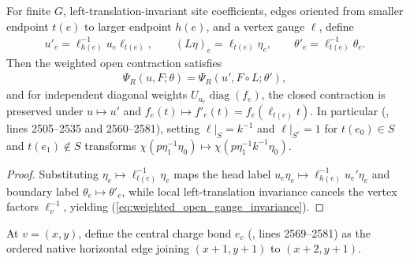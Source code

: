 \begin{lemma}
    \label{thm:peps_regular_weighted_gauge_transport}
    \leanok
    For finite $G$, left-translation-invariant site coefficients, edges oriented from smaller endpoint $t(e)$ to larger endpoint $h(e)$, and a vertex gauge $\ell$, define
    \begin{align}
        u'_e=\ell_{h(e)}^{-1}u_e\ell_{t(e)},\qquad
        (L\eta)_e=\ell_{t(e)}\eta_e,\qquad
        \theta'_e=\ell_{t(e)}^{-1}\theta_e. \label{eq:vertex_gauge_transform}
    \end{align}
    Then the weighted open contraction satisfies
    \begin{align}
        \Psi_R(u,F;\theta)=\Psi_R(u',F\circ L;\theta'), \label{eq:weighted_open_gauge_invariance}
    \end{align}
    and for independent diagonal weights $U_{u_e}\operatorname{diag}(f_e)$, the closed contraction is preserved under $u\mapsto u'$ and $f_e(t)\mapsto f'_e(t)=f_e(\ell_{t(e)}t)$.
    In particular (\cite{Schuch2010PEPS}, lines 2505--2535 and 2560--2581), setting $\ell|_S=k^{-1}$ and $\ell|_{S^c}=1$ for $t(e_0)\in S$ and $t(e_1)\notin S$ transforms $\chi(p\eta_1^{-1}\eta_0)\mapsto\chi(p\eta_1^{-1}k^{-1}\eta_0)$.
\end{lemma}
\begin{proof}\leanok
    Substituting $\eta_e\mapsto\ell_{t(e)}^{-1}\eta_e$ maps the head label $u_e\eta_e\mapsto\ell_{h(e)}^{-1}u_e'\eta_e$ and boundary label $\theta_e\mapsto\theta'_e$, while local left-translation invariance cancels the vertex factors $\ell_v^{-1}$, yielding (\ref{eq:weighted_open_gauge_invariance}).
\end{proof}

\begin{definition}
    \label{def:peps_torus_charge_string_edge}
    \leanok
    At $v=(x,y)$, define the central charge bond $e_c$ (\cite{Schuch2010PEPS}, lines 2569--2581) as the ordered native horizontal edge joining $(x+1,y+1)$ to $(x+2,y+1)$.
\end{definition}

